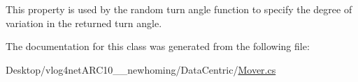 This property is used by the random turn angle function to specify the degree of variation in the returned turn angle. 



The documentation for this class was generated from the following file\-:\begin{DoxyCompactItemize}
\item 
Desktop/vlog4net\-A\-R\-C10\-\_\-\_\-newhoming/\-Data\-Centric/\hyperlink{_mover_8cs}{Mover.\-cs}\end{DoxyCompactItemize}
